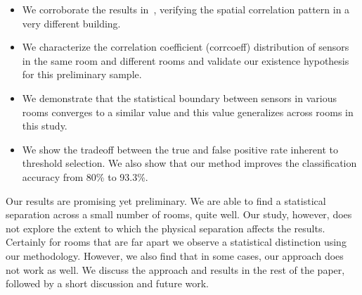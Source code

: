 \begin{itemize}
\item We corroborate the results in~\cite{IOT}, verifying the spatial correlation pattern in a very different building.
\item We characterize the correlation coefficient (corrcoeff) distribution of sensors in the same room and different rooms and validate our existence hypothesis for this preliminary sample.
\item We demonstrate that the statistical boundary between sensors in various rooms converges to a similar value and this value generalizes across rooms in this study.
\item We show the tradeoff between the true and false positive rate inherent to threshold selection. We also show that our method improves the classification accuracy from 80\% to 93.3\%.
\end{itemize}

Our results are promising yet preliminary.  We are able to find a statistical separation across a small number of rooms, quite well.
Our study, however, does not explore the extent to which the physical separation affects the results.  Certainly for rooms that
are far apart we observe a statistical distinction using our methodology.  However, we also find that in some cases, our approach
does not work as well.  We discuss the approach and results in the rest of the paper, followed by a short discussion and future work.


